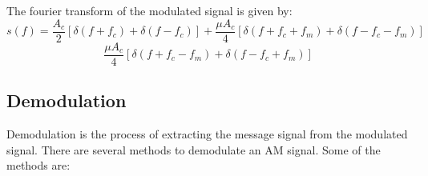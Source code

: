 The fourier transform of the modulated signal is given by:
\[
    s(f)=\frac{A_c}{2}[\delta(f+f_c) + \delta(f-f_c)] + \frac{\mu A_c}{4}[\delta(f+f_c+f_m) + \delta(f-f_c-f_m)] 
\]
\begin{equation}
    \frac{\mu A_c}{4}[\delta(f+f_c-f_m) + \delta(f-f_c+f_m)]
    \label{eq:single_am_fft}
\end{equation}

\subsection*{Demodulation}
Demodulation is the process of extracting the message signal from the modulated signal. There are several methods to demodulate an AM signal. Some of the methods are:
